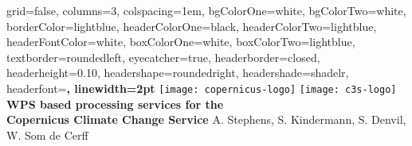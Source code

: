 \documentclass[portrait,a0paper,fontscale=0.4]{baposter} %
\begin{document}


\begin{poster}%
  {
  grid=false,
  columns=3,
  colspacing=1em,
  bgColorOne=white, %
  bgColorTwo=white, %
  borderColor=lightblue, %
  headerColorOne=black, %
  headerColorTwo=lightblue, %
  headerFontColor=white, %
  boxColorOne=white, %
  boxColorTwo=lightblue,
  textborder=roundedleft,
  eyecatcher=true, %
  headerborder=closed, %
  headerheight=0.10\textheight, %
  headershape=roundedright, %
  headershade=shadelr,
  headerfont=\Large\bf\textsc, %
  linewidth=2pt
  }
  {
      \texttt{[image: copernicus-logo]}
      \texttt{[image: c3s-logo]}
  }
  {\sf\bf
          WPS based processing services for the\\
          Copernicus Climate Change Service
  }
  {
    \vspace{1em} A. Stephens, S. Kindermann, S. Denvil, W. Som de Cerff\\
}
\end{poster}
\end{document}
